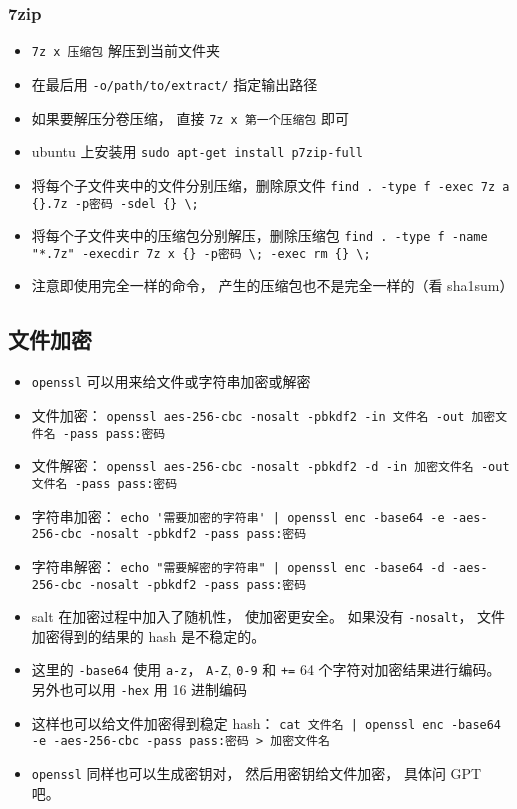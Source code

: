 \subsubsection{7zip}
\begin{itemize}
\item \verb`7z x 压缩包` 解压到当前文件夹
\item 在最后用 \verb`-o/path/to/extract/` 指定输出路径
\item 如果要解压分卷压缩， 直接 \verb`7z x 第一个压缩包` 即可
\item ubuntu 上安装用 \verb`sudo apt-get install p7zip-full`

\item 将每个子文件夹中的文件分别压缩，删除原文件
\verb`find . -type f -exec 7z a {}.7z -p密码 -sdel {} \;`
\item 将每个子文件夹中的压缩包分别解压，删除压缩包
\verb`find . -type f -name "*.7z" -execdir 7z x {} -p密码 \; -exec rm {} \;`
\item 注意即使用完全一样的命令， 产生的压缩包也不是完全一样的（看 sha1sum）
\end{itemize}

\subsection{文件加密}
\begin{itemize}
\item \verb`openssl` 可以用来给文件或字符串加密或解密
\item 文件加密： \verb`openssl aes-256-cbc -nosalt -pbkdf2 -in 文件名 -out 加密文件名 -pass pass:密码`
\item 文件解密： \verb`openssl aes-256-cbc -nosalt -pbkdf2 -d -in 加密文件名 -out 文件名 -pass pass:密码`
\item 字符串加密： \verb`echo '需要加密的字符串' | openssl enc -base64 -e -aes-256-cbc -nosalt -pbkdf2 -pass pass:密码`
\item 字符串解密： \verb`echo "需要解密的字符串" | openssl enc -base64 -d -aes-256-cbc -nosalt -pbkdf2 -pass pass:密码`
\item salt 在加密过程中加入了随机性， 使加密更安全。 如果没有 \verb`-nosalt`， 文件加密得到的结果的 hash 是不稳定的。
\item 这里的 \verb`-base64` 使用 \verb`a-z`， \verb`A-Z`, \verb`0-9` 和 \verb`+=` 64 个字符对加密结果进行编码。 另外也可以用 \verb`-hex` 用 16 进制编码
\item 这样也可以给文件加密得到稳定 hash： \verb`cat 文件名 | openssl enc -base64 -e -aes-256-cbc -pass pass:密码 > 加密文件名`
\item \verb`openssl` 同样也可以生成密钥对， 然后用密钥给文件加密， 具体问 GPT 吧。
\end{itemize}

